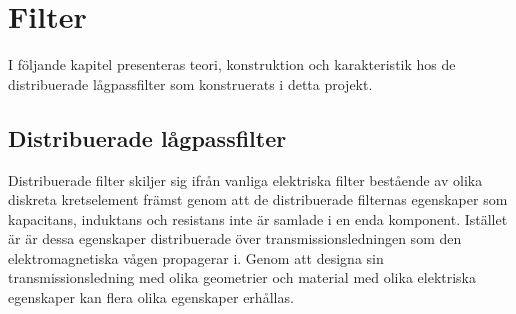 \documentclass[main.tex]{subfiles}
\begin{document}
\chapter{Filter}
\label{ch:filter}
I följande kapitel presenteras teori, konstruktion och karakteristik hos de distribuerade lågpassfilter som konstruerats i detta projekt.



\section{Distribuerade lågpassfilter}
Distribuerade filter skiljer sig ifrån vanliga elektriska filter bestående av olika diskreta kretselement främst genom att de distribuerade filternas egenskaper som kapacitans, induktans och resistans inte är samlade i en enda komponent. Istället är är dessa egenskaper distribuerade över transmissionsledningen som den elektromagnetiska vågen propagerar i. Genom att designa sin transmissionsledning med olika geometrier och material med olika elektriska egenskaper kan flera olika egenskaper erhållas\autocite{cheng}. 
\end{document}
